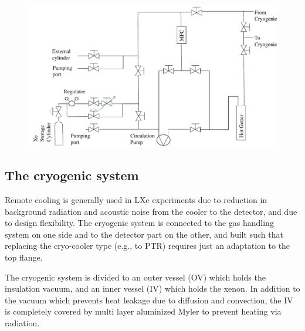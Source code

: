 \begin{figure}[h]
\centerline{\includegraphics[width=0.75\linewidth]{fig/GasSchematics.png}}
\end{figure}


\subsection{The cryogenic system}
\label{subsec:cryo}

Remote cooling is generally used in LXe experiments due to reduction in background radiation and acoustic noise from the cooler to the detector, and due to design flexibility. The cryogenic system is connected to the gas handling system on 
one side and to the detector part on the other, and built such that replacing the cryo-cooler type (e.g., to PTR) requires just an adaptation to the top flange.


The cryogenic system is divided to an outer vessel (OV) which holds 
the insulation vacuum, and an inner vessel (IV) which holds the xenon. In addition to the vacuum which prevents heat leakage due to diffusion and convection, the IV is completely covered by multi layer aluminized Myler to prevent heating via radiation.  

